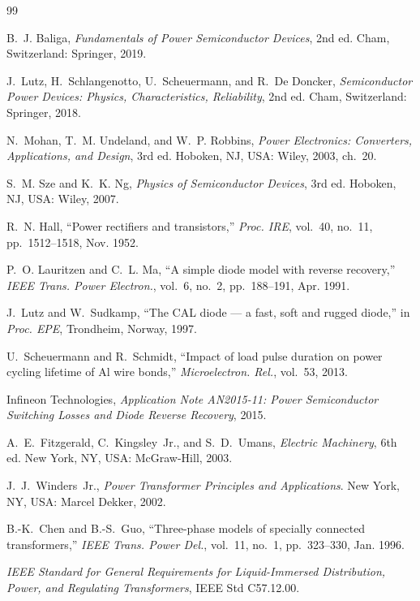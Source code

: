 \begin{thebibliography}{99}

 B.~J. Baliga, \emph{Fundamentals of Power Semiconductor Devices}, 2nd ed. Cham, Switzerland: Springer, 2019.

 J.~Lutz, H.~Schlangenotto, U.~Scheuermann, and R.~De Doncker, \emph{Semiconductor Power Devices: Physics, Characteristics, Reliability}, 2nd ed. Cham, Switzerland: Springer, 2018.

 N.~Mohan, T.~M. Undeland, and W.~P. Robbins, \emph{Power Electronics: Converters, Applications, and Design}, 3rd ed. Hoboken, NJ, USA: Wiley, 2003, ch.~20.

 S.~M. Sze and K.~K. Ng, \emph{Physics of Semiconductor Devices}, 3rd ed. Hoboken, NJ, USA: Wiley, 2007.

 R.~N. Hall, ``Power rectifiers and transistors,'' \emph{Proc. IRE}, vol.~40, no.~11, pp.~1512--1518, Nov. 1952.

 P.~O. Lauritzen and C.~L. Ma, ``A simple diode model with reverse recovery,'' \emph{IEEE Trans. Power Electron.}, vol.~6, no.~2, pp.~188--191, Apr. 1991.

 J.~Lutz and W.~Sudkamp, ``The CAL diode --- a fast, soft and rugged diode,'' in \emph{Proc. EPE}, Trondheim, Norway, 1997.

 U.~Scheuermann and R.~Schmidt, ``Impact of load pulse duration on power cycling lifetime of Al wire bonds,'' \emph{Microelectron. Rel.}, vol.~53, 2013.

 Infineon Technologies, \emph{Application Note AN2015-11: Power Semiconductor Switching Losses and Diode Reverse Recovery}, 2015.

 A.~E.~Fitzgerald, C.~Kingsley~Jr., and S.~D.~Umans, \emph{Electric Machinery}, 6th ed. New York, NY, USA: McGraw-Hill, 2003.

 J.~J.~Winders~Jr., \emph{Power Transformer Principles and Applications}. New York, NY, USA: Marcel Dekker, 2002.

 B.-K.~Chen and B.-S.~Guo, ``Three-phase models of specially connected transformers,'' \emph{IEEE Trans. Power Del.}, vol.~11, no.~1, pp.~323--330, Jan. 1996.

 \emph{IEEE Standard for General Requirements for Liquid-Immersed Distribution, Power, and Regulating Transformers}, IEEE Std C57.12.00.


\end{thebibliography}
